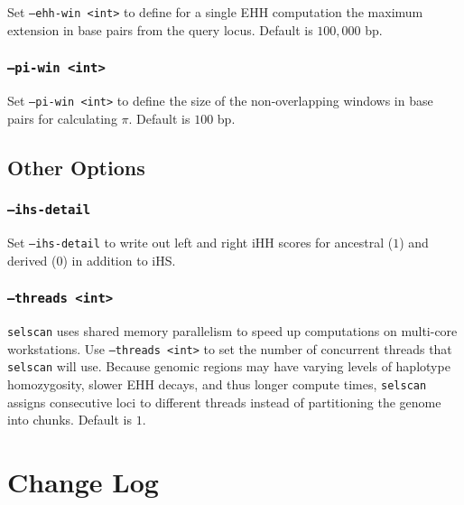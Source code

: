 \documentclass[12pt]{article}%
\begin{document}
Set {\tt --ehh-win <int>} to define for a single EHH computation the maximum extension in base pairs from the query locus.  Default is $100,000$ bp.

\subsubsection{{\tt --pi-win <int>}}

Set {\tt --pi-win <int>} to define the size of the non-overlapping windows in base pairs for calculating $\pi$.  Default is $100$ bp.


\subsection{Other Options}

\subsubsection{{\tt --ihs-detail}}

Set {\tt--ihs-detail} to write out left and right iHH scores for ancestral ($1$) and derived ($0$) in addition to iHS.

\subsubsection{{\tt --threads <int>}}

{\tt selscan} uses shared memory parallelism to speed up computations on multi-core workstations.  Use {\tt --threads <int>} to set the number of concurrent threads that {\tt selscan} will use.  Because genomic regions may have varying levels of haplotype homozygosity, slower EHH decays, and thus longer compute times, {\tt selscan} assigns consecutive loci to different threads instead of partitioning the genome into chunks.  Default is $1$.


\section{Change Log}
\end{document}
